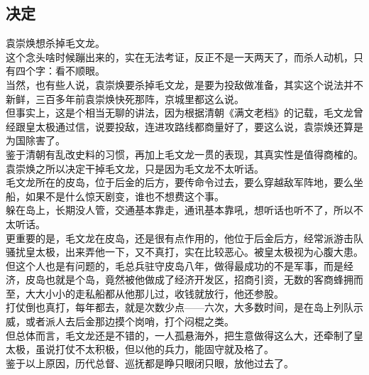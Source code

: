 \begin{multicols}{\theparacolNo}
\subsection{决定}
袁崇焕想杀掉毛文龙。\\

这个念头啥时候蹦出来的，实在无法考证，反正不是一天两天了，而杀人动机，只有四个字：看不顺眼。\\

当然，也有些人说，袁崇焕要杀掉毛文龙，是要为投敌做准备，其实这个说法并不新鲜，三百多年前袁崇焕快死那阵，京城里都这么说。\\

但事实上，这是个相当无聊的讲法，因为根据清朝《满文老档》的记载，毛文龙曾经跟皇太极通过信，说要投敌，连进攻路线都商量好了，要这么说，袁崇焕还算是为国除害了。\\

鉴于清朝有乱改史料的习惯，再加上毛文龙一贯的表现，其真实性是值得商榷的。\\

袁崇焕之所以决定干掉毛文龙，只是因为毛文龙不太听话。\\

毛文龙所在的皮岛，位于后金的后方，要传命令过去，要么穿越敌军阵地，要么坐船，如果不是什么惊天剧变，谁也不想费这个事。\\

躲在岛上，长期没人管，交通基本靠走，通讯基本靠吼，想听话也听不了，所以不太听话。\\

更重要的是，毛文龙在皮岛，还是很有点作用的，他位于后金后方，经常派游击队骚扰皇太极，出来弄他一下，又不真打，实在比较恶心。被皇太极视为心腹大患。\\

但这个人也是有问题的，毛总兵驻守皮岛八年，做得最成功的不是军事，而是经济，皮岛也就是个岛，竟然被他做成了经济开发区，招商引资，无数的客商蜂拥而至，大大小小的走私船都从他那儿过，收钱就放行，他还参股。\\

打仗倒也真打，每年都去，就是次数少点——六次，大多数时间，是在岛上列队示威，或者派人去后金那边摸个岗哨，打个闷棍之类。\\

但总体而言，毛文龙还是不错的，一人孤悬海外，把生意做得这么大，还牵制了皇太极，虽说打仗不太积极，但以他的兵力，能固守就及格了。\\

鉴于以上原因，历代总督、巡抚都是睁只眼闭只眼，放他过去了。\\


\end{multicols}
